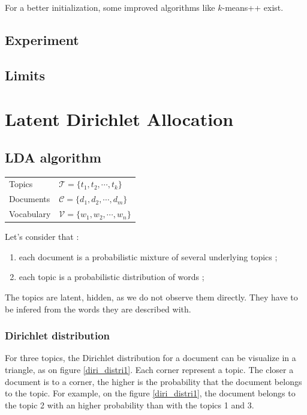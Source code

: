 \documentclass[a4paper,12pt]{report}
\begin{document}
For a better initialization, some improved algorithms like $k$-means++ exist.


\subsection{Experiment}

\subsection{Limits}

\newpage
\section{Latent Dirichlet Allocation}

\subsection{LDA algorithm}

\begin{center}
\begin{tabular}{ll}
Topics & $ \mathcal{T} = \{t_1,t_2,\cdots,t_k\} $ \\
Documents & $ \mathcal{C} = \{d_1,d_2,\cdots,d_m\} $ \\
Vocabulary & $ \mathcal{V} = \{w_1,w_2,\cdots,w_n\} $ \\
\end{tabular}
\end{center}

Let's consider that : 
\begin{enumerate}
\item each document is a probabilistic mixture of several underlying topics ;
\item each topic is a probabilistic distribution of words ;
\end{enumerate}

The topics are latent, hidden, as we do not observe them directly. They have to be infered from the words they are described with.

\subsubsection{Dirichlet distribution}
For three topics, the Dirichlet distribution for a document can be visualize in a triangle, as on figure \ref{diri_distri1}. Each corner represent a topic. The closer a document is to a corner, the higher is the probability that the document belongs to the topic. For example, on the figure \ref{diri_distri1}, the document belongs to the topic 2 with an higher probability than with the topics 1 and 3.
\end{document}
